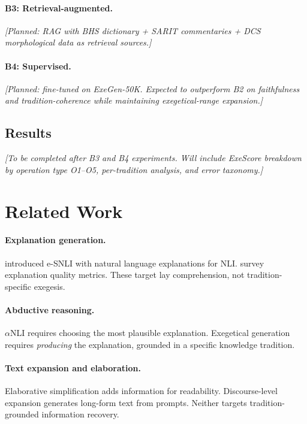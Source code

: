 \documentclass[11pt]{article}
\begin{document}
\paragraph{B3: Retrieval-augmented.}
\textit{[Planned: RAG with BHS dictionary + SARIT commentaries + DCS morphological data as retrieval sources.]}

\paragraph{B4: Supervised.}
\textit{[Planned: fine-tuned on ExeGen-50K. Expected to outperform B2 on faithfulness and tradition-coherence while maintaining exegetical-range expansion.]}

\subsection{Results}

\textit{[To be completed after B3 and B4 experiments. Will include ExeScore breakdown by operation type O1--O5, per-tradition analysis, and error taxonomy.]}


\section{Related Work}
\label{sec:related}

\paragraph{Explanation generation.}
\citet{camburu2018snli} introduced e-SNLI with natural language explanations for NLI. \citet{wiegreffe2021measuring} survey explanation quality metrics. These target lay comprehension, not tradition-specific exegesis.

\paragraph{Abductive reasoning.}
$\alpha$NLI \cite{bhagavatula2020abductive} requires choosing the most plausible explanation. Exegetical generation requires \textit{producing} the explanation, grounded in a specific knowledge tradition.

\paragraph{Text expansion and elaboration.}
Elaborative simplification \cite{srikanth2021elaborative} adds information for readability. Discourse-level expansion \cite{fan2018hierarchical} generates long-form text from prompts. Neither targets tradition-grounded information recovery.
\end{document}
